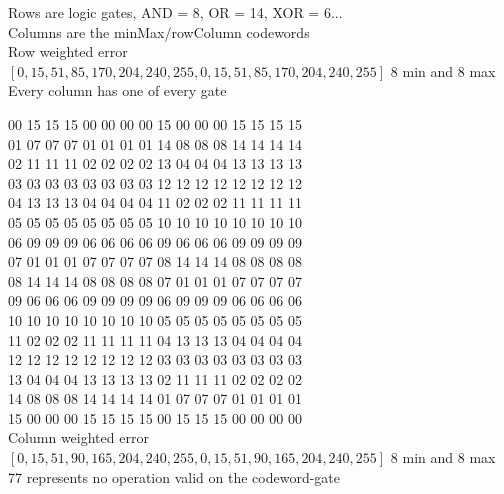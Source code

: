 \documentclass[11pt]{article}
\begin{document}
\begin{center}
Rows are logic gates, AND = 8, OR = 14, XOR = 6...\\
Columns are the minMax/rowColumn codewords\\
\hfill \break
Row weighted error\\
$[0,15,51,85,170,204,240,255,0,15,51,85,170,204,240,255]$ 8 min and 8 max\\
Every column has one of every gate\\
\hfill \break

00 15 15 15 00 00 00 00 15 00 00 00 15 15 15 15 \\
01 07 07 07 01 01 01 01 14 08 08 08 14 14 14 14 \\
02 11 11 11 02 02 02 02 13 04 04 04 13 13 13 13 \\
03 03 03 03 03 03 03 03 12 12 12 12 12 12 12 12 \\
04 13 13 13 04 04 04 04 11 02 02 02 11 11 11 11 \\
05 05 05 05 05 05 05 05 10 10 10 10 10 10 10 10 \\
06 09 09 09 06 06 06 06 09 06 06 06 09 09 09 09 \\
07 01 01 01 07 07 07 07 08 14 14 14 08 08 08 08 \\
08 14 14 14 08 08 08 08 07 01 01 01 07 07 07 07 \\
09 06 06 06 09 09 09 09 06 09 09 09 06 06 06 06 \\
10 10 10 10 10 10 10 10 05 05 05 05 05 05 05 05 \\
11 02 02 02 11 11 11 11 04 13 13 13 04 04 04 04 \\
12 12 12 12 12 12 12 12 03 03 03 03 03 03 03 03 \\
13 04 04 04 13 13 13 13 02 11 11 11 02 02 02 02 \\
14 08 08 08 14 14 14 14 01 07 07 07 01 01 01 01 \\
15 00 00 00 15 15 15 15 00 15 15 15 00 00 00 00 \\
\hfill \break
Column weighted error\\
$[0,15,51,90,165,204,240,255,0,15,51,90,165,204,240,255]$ 8 min and 8 max\\
77 represents no operation valid on the codeword-gate\\ 
\hfill \break


\end{center}
\end{document}
